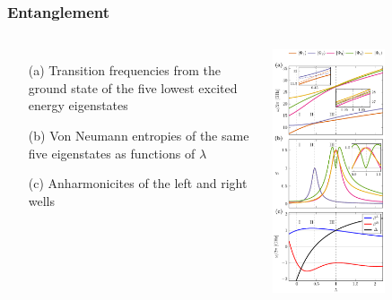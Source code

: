 \documentclass{beamer}
\begin{document}
\frame
    {
      \frametitle{Entanglement}
	
      \begin{footnotesize}
     \begin{columns}
       \column{5.0cm}
\begin{itemize}
\item[(a)] Transition frequencies from the ground state of the five lowest excited energy eigenstates

\item[(b)] Von Neumann entropies of the same five eigenstates as functions of $\lambda$

\item[(c)] Anharmonicites of the left and right wells 
\end{itemize}

\column{6cm}
      \begin{center}
	\includegraphics[width=0.6\textwidth]{qcfigures/entanglement.pdf}
      \end{center}
\end{columns}
      \end{footnotesize}
    }
\end{document}
